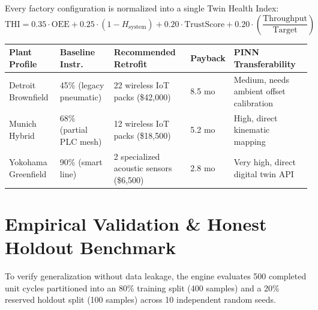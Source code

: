 \documentclass[11pt]{article}
\begin{document}
Every factory configuration is normalized into a single Twin Health Index:
\begin{equation}
\text{THI} = 0.35 \cdot \text{OEE} + 0.25 \cdot (1 - H_{\text{system}}) + 0.20 \cdot \text{TrustScore} + 0.20 \cdot \left(\frac{\text{Throughput}}{\text{Target}}\right)
\end{equation}

\begin{center}
\small
\begin{tabular}{p{2.6cm}p{3.0cm}p{3.4cm}p{1.6cm}p{3.2cm}}
\toprule
\textbf{Plant Profile} & \textbf{Baseline Instr.} & \textbf{Recommended Retrofit} & \textbf{Payback} & \textbf{PINN Transferability} \\
\midrule
Detroit Brownfield & 45\% (legacy pneumatic) & 22 wireless IoT packs (\$42{,}000) & 8.5 mo & Medium, needs ambient offset calibration \\[4pt]
Munich Hybrid & 68\% (partial PLC mesh) & 12 wireless IoT packs (\$18{,}500) & 5.2 mo & High, direct kinematic mapping \\[4pt]
Yokohama Greenfield & 90\% (smart line) & 2 specialized acoustic sensors (\$6{,}500) & 2.8 mo & Very high, direct digital twin API \\
\bottomrule
\end{tabular}
\end{center}

\newpage
\section{Empirical Validation \& Honest Holdout Benchmark}

To verify generalization without data leakage, the engine evaluates 500 completed unit cycles partitioned into an 80\% training split (400 samples) and a 20\% reserved holdout split (100 samples) across 10 independent random seeds.
\end{document}

